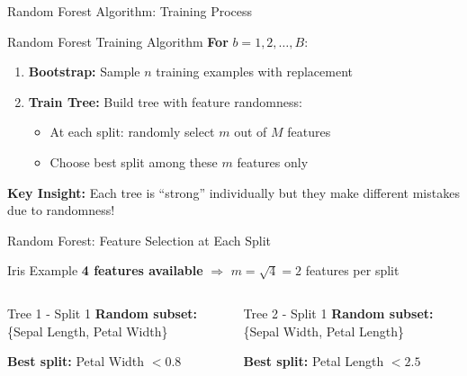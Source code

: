 \documentclass[9pt]{beamer}
\begin{document}
\begin{frame}{Random Forest Algorithm: Training Process}
\begin{alertbox}{Random Forest Training Algorithm}
\textbf{For } $b = 1, 2, \ldots, B$:
\begin{enumerate}
\item \textbf{Bootstrap:} Sample $n$ training examples with replacement
\item \textbf{Train Tree:} Build tree with feature randomness:
\begin{itemize}
\item At each split: randomly select $m$ out of $M$ features
\item Choose best split among these $m$ features only
\end{itemize}
\end{enumerate}
\end{alertbox}

\begin{keypointsbox}
\textbf{Key Insight:} Each tree is ``strong'' individually but they make different mistakes due to randomness!
\end{keypointsbox}
\end{frame}

\begin{frame}{Random Forest: Feature Selection at Each Split}
\begin{examplebox}{Iris Example}
\textbf{4 features available} $\Rightarrow$ $m = \sqrt{4} = 2$ features per split
\end{examplebox}

\begin{columns}
\begin{column}{0.48\textwidth}
\begin{definitionbox}{Tree 1 - Split 1}
\textbf{Random subset:} \{Sepal Length, Petal Width\}

\textbf{Best split:} Petal Width $< 0.8$
\end{definitionbox}
\end{column}

\begin{column}{0.48\textwidth}
\begin{definitionbox}{Tree 2 - Split 1}
\textbf{Random subset:} \{Sepal Width, Petal Length\}

\textbf{Best split:} Petal Length $< 2.5$
\end{definitionbox}
\end{column}
\end{columns}
\end{frame}
\end{document}

